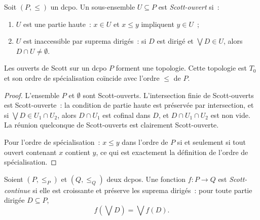 \begin{definition}
Soit $(P, \leq)$ un dcpo. Un sous-ensemble $U \subseteq P$ est \emph{Scott-ouvert} si~:
\begin{enumerate}
  \item $U$ est une partie haute~: $x \in U$ et $x \leq y$ impliquent $y \in U$~;
  \item $U$ est inaccessible par suprema dirig\'es~: si $D$ est dirig\'e et
    $\bigvee D \in U$, alors $D \cap U \neq \emptyset$.
\end{enumerate}
\end{definition}

\begin{proposition}
Les ouverts de Scott sur un dcpo $P$ forment une topologie. Cette topologie est $T_0$
et son ordre de sp\'ecialisation co\"incide avec l'ordre $\leq$ de $P$.
\end{proposition}

\begin{proof}
L'ensemble $P$ et $\emptyset$ sont Scott-ouverts. L'intersection finie de Scott-ouverts
est Scott-ouverte~: la condition de partie haute est pr\'eserv\'ee par intersection, et si
$\bigvee D \in U_1 \cap U_2$, alors $D \cap U_1$ est cofinal dans $D$, et
$D \cap U_1 \cap U_2$ est non vide. La r\'eunion quelconque de Scott-ouverts est
clairement Scott-ouverte.

Pour l'ordre de sp\'ecialisation~: $x \leq y$ dans l'ordre de $P$ si et seulement si
tout ouvert contenant $x$ contient $y$, ce qui est exactement la d\'efinition de l'ordre
de sp\'ecialisation.
\end{proof}

\begin{center}
\end{center}

\begin{definition}
Soient $(P, \leq_P)$ et $(Q, \leq_Q)$ deux dcpos. Une fonction $f\colon P \to Q$ est
\emph{Scott-continue} si elle est croissante et pr\'eserve les suprema dirig\'es~: pour
toute partie dirig\'ee $D \subseteq P$,
\[
  f\!\left(\bigvee D\right) = \bigvee f(D).
\]
\end{definition}

